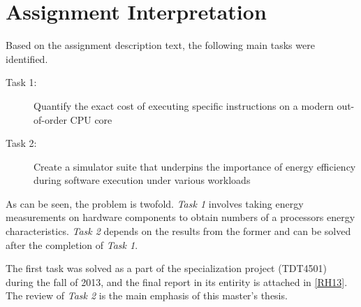 \section{Assignment Interpretation}

Based on the assignment description text, the following main tasks were
identified.

\begin{description}
    \item[Task 1:] Quantify the exact cost of executing specific instructions on
        a modern out-of-order CPU core
    \item[Task 2:] Create a simulator suite that underpins the importance of
        energy efficiency during software execution under various workloads
\end{description}

As can be seen, the problem is twofold. \textit{Task 1} involves taking energy
measurements on hardware components to obtain numbers of a processors energy
characteristics. \textit{Task 2} depends on the results from the former and can
be solved after the completion of \textit{Task 1}.

The first task was solved as a part of the specialization project (TDT4501)
during the fall of 2013, and the final report in its entirity is attached in
\autoref{RH13}. The review of \textit{Task 2} is the main emphasis of this
master's thesis.
